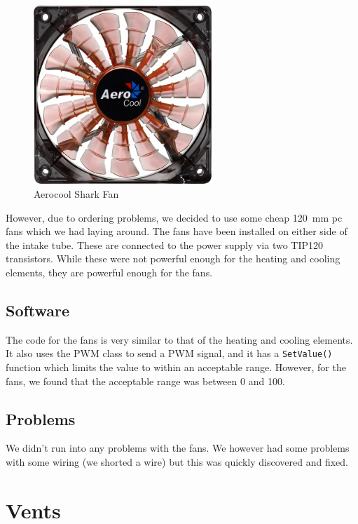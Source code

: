 \documentclass[a4paper,oneside]{book}
\begin{document}
\begin{figure}[!htb]
\centering
\includegraphics[width=0.6\textwidth]{images/fan.jpg}
\caption{Aerocool Shark Fan \protect\cite{aerocool}}
\label{fig:fan}
\end{figure}

However, due to ordering problems, we decided to use some cheap \SI{120}{\mm}
pc fans which we had laying around. The fans have been installed on either side
of the intake tube. These are connected to the power supply via two TIP120
transistors. While these were not powerful enough for the heating and cooling
elements, they are powerful enough for the fans.

\subsection{Software}
The code for the fans is very similar to that of the heating and cooling
elements. It also uses the PWM class to send a PWM signal, and it has a
\lstinline|SetValue()| function which limits the value to within an acceptable
range.  However, for the fans, we found that the acceptable range was between 0
and 100.



\subsection{Problems}
We didn't run into any problems with the fans. We however had some problems
with some wiring (we shorted a wire) but this was quickly discovered and fixed.

\section{Vents}
\end{document}
